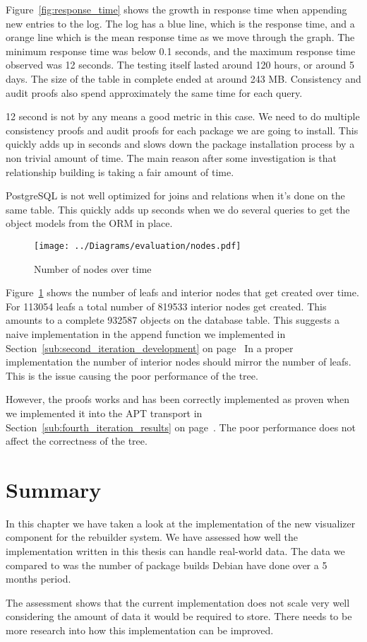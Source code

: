 \documentclass[../Main/thesis.tex]{subfiles}
\begin{document}
Figure~\ref{fig:response_time} shows the growth in response time when appending
new entries to the log. The log has a blue line, which is the response time, and
a orange line which is the mean response time as we move through the graph. The
minimum response time was below 0.1 seconds, and the maximum response time
observed was 12 seconds. The testing itself lasted around 120 hours, or around 5
days. The size of the table in complete ended at around 243 MB. Consistency and
audit proofs also spend approximately the same time for each query.

12 second is not by any means a good metric in this case. We need to do multiple
consistency proofs and audit proofs for each package we are going to install.
This quickly adds up in seconds and slows down the package installation process
by a non trivial amount of time. The main reason after some investigation is
that relationship building is taking a fair amount of time.

PostgreSQL is not well optimized for joins and relations when it's done on the
same table. This quickly adds up seconds when we do several queries to get the
object models from the ORM in place.

\begin{figure}[H]
\centering
\texttt{[image: ../Diagrams/evaluation/nodes.pdf]}
\caption{Number of nodes over time}
\label{fig:nodes_figure}
\end{figure}

Figure~\ref{fig:nodes_figure} shows the number of leafs and interior nodes that
get created over time. For 113054 leafs a total number of 819533 interior nodes
get created. This amounts to a complete 932587 objects on the database table.
This suggests a naive implementation in the append function we implemented
in Section~\ref{sub:second_iteration_development} on
page~\pageref{sub:second_iteration_development} In a proper implementation the
number of interior nodes should mirror the number of leafs. This is the issue
causing the poor performance of the tree.

However, the proofs works and has been correctly implemented as proven when we
implemented it into the APT transport in Section~\ref{sub:fourth_iteration_results} on
page~\pageref{sub:fourth_iteration_results}. The poor performance does not
affect the correctness of the tree.

\section{Summary}%
\label{sec:evaluation_summary}
In this chapter we have taken a look at the implementation of the new visualizer
component for the rebuilder system. We have assessed how well the implementation
written in this thesis can handle real-world data. The data we compared to was
the number of package builds Debian have done over a 5 months period. 

The assessment shows that the current implementation does not scale very well
considering the amount of data it would be required to store. There needs to be
more research into how this implementation can be improved.

\blankpage
\end{document}
